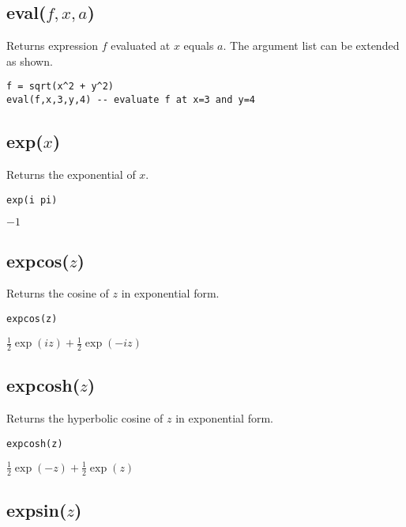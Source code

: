 \subsection*{eval($f,x,a$)}

Returns expression $f$ evaluated at $x$ equals $a$.
The argument list can be extended as shown.

{\color{blue}
\begin{verbatim}
f = sqrt(x^2 + y^2)
eval(f,x,3,y,4) -- evaluate f at x=3 and y=4
\end{verbatim}
}


\subsection*{exp($x$)}

Returns the exponential of $x$.

{\color{blue}
\begin{verbatim}
exp(i pi)
\end{verbatim}
}

\noindent
$-1$

\subsection*{expcos($z$)}

Returns the cosine of $z$ in exponential form.

{\color{blue}
\begin{verbatim}
expcos(z)
\end{verbatim}
}

\noindent
$\displaystyle \tfrac{1}{2}\exp(iz)+\tfrac{1}{2}\exp(-iz)$

\subsection*{expcosh($z$)}

Returns the hyperbolic cosine of $z$ in exponential form.

{\color{blue}
\begin{verbatim}
expcosh(z)
\end{verbatim}
}

\noindent
$\displaystyle \tfrac{1}{2}\exp(-z)+\tfrac{1}{2}\exp(z)$

\subsection*{expsin($z$)}

